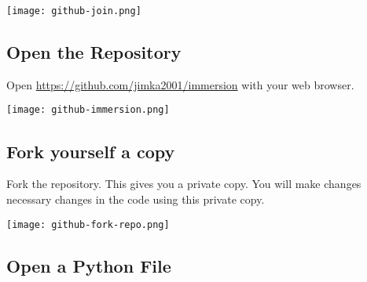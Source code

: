 \noindent\texttt{[image: github-join.png]}



\subsection{Open the Repository}
  
Open \url{https://github.com/jimka2001/immersion} with your web browser.

\noindent\texttt{[image: github-immersion.png]}


\subsection{Fork yourself a copy}

Fork the repository.  This gives you a private copy.  You will make changes
necessary changes in the code using this private copy.

\noindent \texttt{[image: github-fork-repo.png]}



\subsection{Open a Python File}
  
